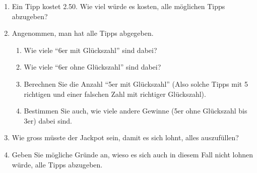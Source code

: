 \begin{ueb}
    \begin{enumerate}
        \item Ein Tipp kostet 2.50. Wie viel würde es kosten, alle möglichen Tipps abzugeben?

        \item Angenommen, man hat alle Tipps abgegeben.
              \begin{enumerate}
                  \item Wie viele ``6er mit Glückszahl'' sind dabei?
                  \item Wie viele ``6er ohne Glückszahl'' sind dabei?
                  \item Berechnen Sie die Anzahl ``5er mit Glückszahl'' (Also solche Tipps mit 5 richtigen und einer falschen Zahl mit richtiger Glückszahl).
                  \item Bestimmen Sie auch, wie viele andere Gewinne (5er ohne Glückszahl bis 3er) dabei sind.
              \end{enumerate}

        \item Wie gross müsste der Jackpot sein, damit es sich lohnt, alles auszufüllen?

        \item Geben Sie mögliche Gründe an, wieso es sich auch in diesem Fall nicht lohnen würde, alle Tipps abzugeben.
    \end{enumerate}
\end{ueb}

\clearpage

